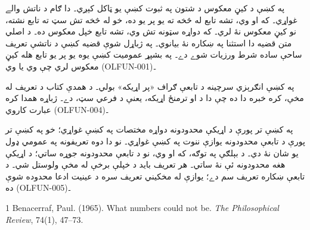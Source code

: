 \documentclass[12pt,a4paper,oneside]{report}
\newcommand{\tuple}[1]{\langle #1\rangle}
\begin{document}
په  کښې د کيڼ معکوس د شتون په ثبوت کښې
يو  ټاکل کېږي۔ دا ګام د  ناتش والے غواړي۔ که
 او  وي، تشه تابع له  څخه 
ته يو پر يو ده، خو له  څخه تش سټ ته تابع نشته، نو کيڼ معکوس
نۀ لري۔ که دواړه سټونه تش وي، تشه تابع خپل معکوس ده۔ د اصلي
متن قضيه دا استثنا په ښکاره نۀ بيانوي۔ په ژباړل شوې قضيه کښې
د ناتشې تعريف ساحې ساده شرط ورزيات شوے دے۔ په بشپړ عموميت کښې
يوه يو پر يو تابع هله کيڼ معکوس لري چې  وي يا
 وي (OLFUN-001)۔

په  کښې انګرېزي سرچينه د تابعې ګراف
«پر  اړيکه» بولي۔ د همدې کتاب د تعريف له مخې، کره خبره
دا ده چې دا د  او  ترمنځ اړيکه، يعنې د  فرعي
سټ، دے۔ ژباړه همدا کره عبارت کاروي (OLFUN-004)۔

په  کښې تر  پورې د اړيکې محدودونه
دواړه مختصات په  کښې غواړي؛ خو په 
کښې تر  پورې د تابعې محدودونه يوازې ننوت په  کښې غواړي۔
نو دا دوه تعريفونه په عمومي ډول يو شان نۀ دي۔ د بېلګې په توګه،
که  او  وي، نو د تابعې محدودونه جوړه
\LR{$\tuple{0,1}$} ساتي؛ د اړيکې هغه محدودونه ئې نۀ ساتي۔ هر تعريف
بايد د خپلې برخې له مخې ولوستل شي۔ د تابعې ښکاره تعريف سم دے؛
يوازې له مخکيني تعريف سره د عينيت ادعا محدوده شوې ده (OLFUN-005)۔

\clearpage
\begin{LTR}\latinfont
\begin{thebibliography}{1}
Benacerraf, Paul. (1965). What numbers could not be. \emph{The Philosophical Review}, 74(1), 47--73.
\end{thebibliography}
\end{LTR}
\end{document}
